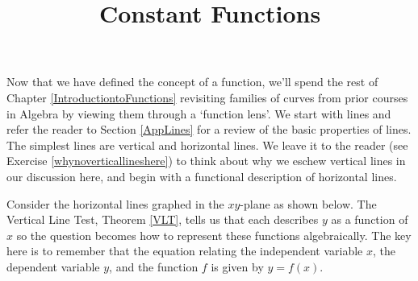 \documentclass{ximera}
\title{Constant Functions} \license{CC BY-NC-SA 4.0}
\begin{document}
\begin{abstract}
\end{abstract}
\maketitle



Now that we have defined the concept of a function, we'll spend the rest of Chapter \ref{IntroductiontoFunctions} revisiting families of curves from prior courses in Algebra by viewing them through a `function lens'.  We start with lines and refer the reader to Section \ref{AppLines} for a review of the basic properties of lines.  The simplest lines are vertical and horizontal lines.  We leave it to the reader (see Exercise \ref{whynoverticallineshere}) to think about why we eschew vertical lines in our discussion here, and begin with a functional description of horizontal lines.  



Consider the horizontal lines graphed in the $xy$-plane as shown below. The Vertical Line Test, Theorem \ref{VLT}, tells us that each describes $y$ as a function of $x$ so the question becomes how to represent these functions algebraically. The key here is to remember that the equation relating the independent variable $x$,  the dependent variable  $y$, and the function $f$ is given by $y = f(x)$.
\end{document}
